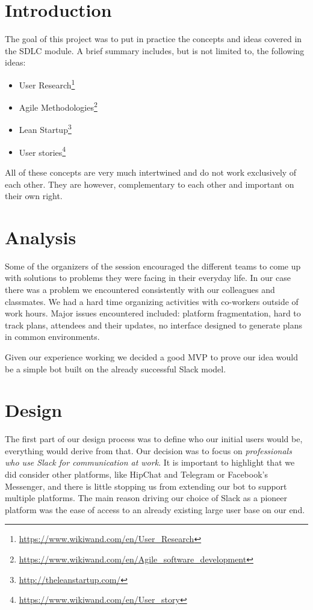 \documentclass[english,a4paper,]{report}
\renewcommand{\href}[2]{#2\footnote{\url{#1}}}
\providecommand{\tightlist}{%
  \setlength{\itemsep}{0pt}\setlength{\parskip}{0pt}}
\begin{document}
\chapter{Introduction}\label{introduction}

The goal of this project was to put in practice the concepts and ideas
covered in the SDLC module. A brief summary includes, but is not limited
to, the following ideas:

\begin{itemize}
\tightlist
\item
  \href{https://www.wikiwand.com/en/User_Research}{User Research}
\item
  \href{https://www.wikiwand.com/en/Agile_software_development}{Agile
  Methodologies}
\item
  \href{http://theleanstartup.com/}{Lean Startup}
\item
  \href{https://www.wikiwand.com/en/User_story}{User stories}
\end{itemize}

All of these concepts are very much intertwined and do not work
exclusively of each other. They are however, complementary to each other
and important on their own right.

\chapter{Analysis}\label{analysis}

Some of the organizers of the session encouraged the different teams to
come up with solutions to problems they were facing in their everyday
life. In our case there was a problem we encountered consistently with
our colleagues and classmates. We had a hard time organizing activities
with co-workers outside of work hours. Major issues encountered
included: platform fragmentation, hard to track plans, attendees and
their updates, no interface designed to generate plans in common
environments.

Given our experience working we decided a good MVP to prove our idea
would be a simple bot built on the already successful Slack model.

\chapter{Design}\label{design}

The first part of our design process was to define who our initial users
would be, everything would derive from that. Our decision was to focus
on \emph{professionals who use Slack for communication at work}. It is
important to highlight that we did consider other platforms, like
HipChat and Telegram or Facebook's Messenger, and there is little
stopping us from extending our bot to support multiple platforms. The
main reason driving our choice of Slack as a pioneer platform was the
ease of access to an already existing large user base on our end.
\end{document}
